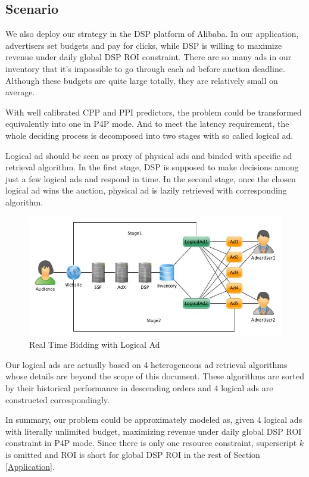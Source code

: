 \documentclass{article}
\begin{document}
\subsection{Scenario}

We also deploy our strategy in the DSP platform of Alibaba.
In our application, advertisers set budgets and pay for clicks, while DSP is willing to maximize revenue under daily global DSP ROI constraint.
There are so many ads in our inventory that it's impossible to go through each ad before auction deadline.
Although these budgets are quite large totally, they are relatively small on average.

With well calibrated CPP and PPI predictors, the problem could be transformed equivalently into one in P4P mode.
And to meet the latency requirement, the whole deciding process is decomposed into two stages with so called logical ad.

Logical ad should be seen as proxy of physical ads and binded with specific ad retrieval algorithm.
In the first stage, DSP is supposed to make decisions among just a few logical ads and respond in time.
In the second stage, once the chosen logical ad wins the auction, physical ad is lazily retrieved with corresponding algorithm.

\begin{figure}[!h]
\centering
\includegraphics[width=1.0\linewidth]{./LogicalAd.jpg}
\caption{Real Time Bidding with Logical Ad}
\end{figure}

Our logical ads are actually based on 4 heterogeneous ad retrieval algorithms whose details are beyond the scope of this document.
These algorithms are sorted by their historical performance in descending orders and 4 logical ads are constructed correspondingly.

In summary, our problem could be approximately modeled as, given 4 logical ads with literally unlimited budget,
    maximizing revenue under daily global DSP ROI constraint in P4P mode.
Since there is only one resource constraint, superscript $k$ is omitted and
    ROI is short for global DSP ROI in the rest of Section \ref{Application}.
\end{document}

